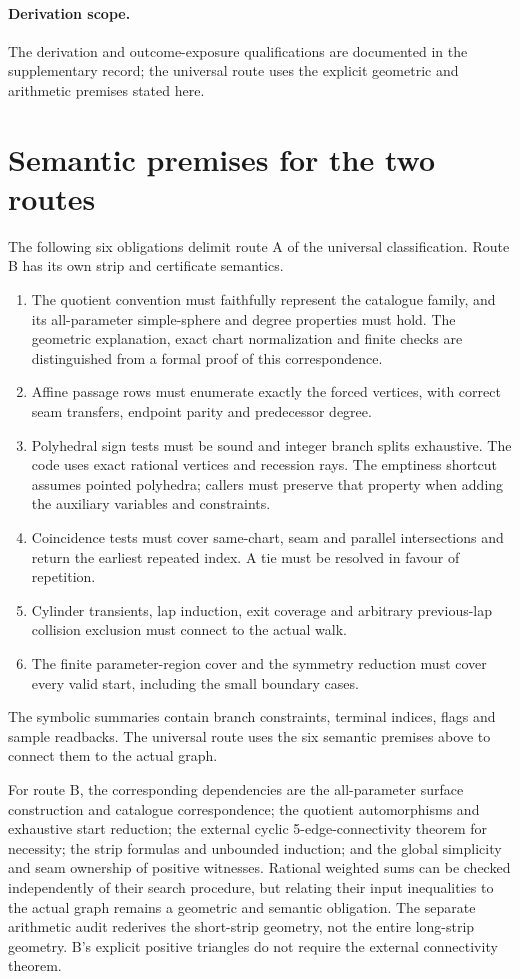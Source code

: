 \documentclass[11pt]{amsart}
\newcommand{\claimid}[1]{}
\theoremstyle{definition}\newtheorem{definition}[theorem]{Definition}
\begin{document}
\paragraph{Derivation scope.}\label{claim:independence}
The derivation and outcome-exposure qualifications are documented in
the supplementary record; the universal route uses the explicit
geometric and arithmetic premises stated here.
\claimid{claim:independence}

\section{Semantic premises for the two routes}\label{sec:trust}
The following six obligations delimit route A of the universal
classification. Route B has its own strip and certificate semantics.
\begin{enumerate}
\item The quotient convention must faithfully represent the catalogue
family, and its all-parameter simple-sphere and degree properties must
hold. The geometric explanation, exact chart normalization and finite
checks are distinguished from a formal proof of this correspondence.
\item Affine passage rows must enumerate exactly the forced vertices,
with correct seam transfers, endpoint parity and predecessor degree.
\item Polyhedral sign tests must be sound and integer branch splits
exhaustive. The code uses exact rational vertices and recession rays.
The emptiness shortcut assumes pointed polyhedra; callers must preserve
that property when adding the auxiliary variables and constraints.
\item Coincidence tests must cover same-chart, seam and parallel
intersections and return the earliest repeated index. A tie must be
resolved in favour of repetition.
\item Cylinder transients, lap induction, exit coverage and arbitrary
previous-lap collision exclusion must connect to the actual walk.
\item The finite parameter-region cover and the symmetry reduction
must cover every valid start, including the small boundary cases.
\end{enumerate}
The symbolic summaries contain branch constraints, terminal indices,
flags and sample readbacks. The universal route uses the six semantic
premises above to connect them to the actual graph.

For route B, the corresponding dependencies are the all-parameter
surface construction and catalogue correspondence; the quotient
automorphisms and exhaustive start reduction; the external cyclic
5-edge-connectivity theorem for necessity; the strip formulas and
unbounded induction; and the global simplicity and seam ownership of
positive witnesses. Rational weighted sums can be checked independently
of their search procedure, but relating their input inequalities to the
actual graph remains a geometric and semantic obligation. The separate
arithmetic audit rederives the short-strip geometry, not the entire
long-strip geometry. B's explicit positive triangles do not require
the external connectivity theorem.
\end{document}
